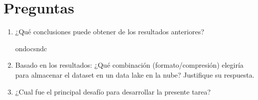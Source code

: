 \documentclass{article}
\begin{document}
	\section{Preguntas}
		\begin{enumerate}
			\item ¿Qué conclusiones puede obtener de los resultados anteriores?
			
			ondocsndc
			
			\item Basado en los resultados: ¿Qué combinación (formato/compresión) elegiría
			para almacenar el dataset en un data lake en la nube? Justifique su respuesta.
			\item ¿Cual fue el principal desafío para desarrollar la presente tarea?
		\end{enumerate}
		
\end{document}

